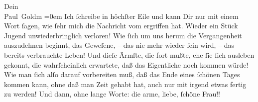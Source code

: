 \begin{ledgroupsized}[t]{13cm}
           \pstart
           Dein {\\[\baselineskip]}\spacefill\mbox{Paul Goldm}\pend
           \leftskip=0em{}\pstart
           \noindent{}Ich ſchreibe in höchſter Eile und kann Dir nur mit einem {\pb}Wort ſagen, wie ſehr mich die Nachricht vom
                     \label{K_L02831-11v}\label{K_L02831-11h} ergriffen hat. Wieder ein Stück Jugend unwiederbringlich verloren!
                  Wie ſich um uns  herum die Vergangenheit
                  auszudehnen beginnt, das Geweſene, – das nie mehr wieder ſein wird, – das bereits
                  verbrauchte Leben! Und dieſe Ärmſte, die fort mußte, ehe ſie ſich ausleben gekonnt, die wahrſcheinlich
                  erwartete, daß das Eigentliche noch kommen würde! Wie man ſich alſo darauf
                  vorbereiten muß, daß das Ende eines {\pb}ſchönen
                  Tages kommen kann, ohne daß man Zeit gehabt hat, auch nur mit irgend etwas fertig
                  zu werden! Und dann, ohne lange Worte: die arme, liebe, ſchöne Frau!!\pend
           
         
         \endnumbering{}\end{ledgroupsized}  \newcommand{\dateiname}{L02831}\newcommand{\titel}{Paul Goldmann an Arthur Schnitzler, 19. 11. [1897]}\newcommand{\editorInnen}{Martin Anton Müller und Laura Untner}
      